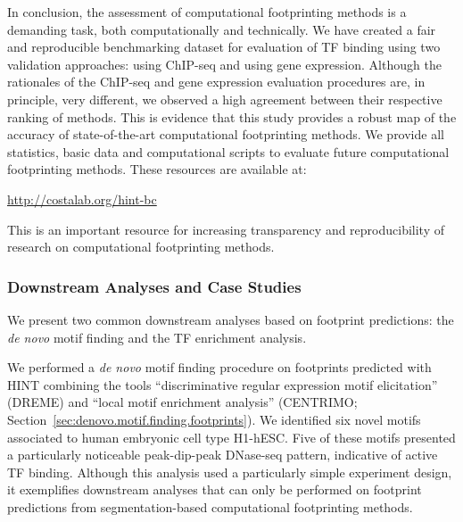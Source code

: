 In conclusion, the assessment of computational footprinting methods is a demanding task, both computationally and technically. We have created a fair and reproducible benchmarking dataset for evaluation of TF binding using two validation approaches: using ChIP-seq and using gene expression. Although the rationales of the ChIP-seq and gene expression evaluation procedures are, in principle, very different, we observed a high agreement between their respective ranking of methods. This is evidence that this study provides a robust map of the accuracy of state-of-the-art computational footprinting methods. We provide all statistics, basic data and computational scripts to evaluate future computational footprinting methods. These resources are available at:

\begin{center}
\url{http://costalab.org/hint-bc}
\end{center}

This is an important resource for increasing transparency and reproducibility of research on computational footprinting methods.

\subsubsection{Downstream Analyses and Case Studies}

We present two common downstream analyses based on footprint predictions: the \emph{de novo} motif finding and the TF enrichment analysis.

We performed a \emph{de novo} motif finding procedure on footprints predicted with HINT combining the tools ``discriminative regular expression motif elicitation'' (DREME) and ``local motif enrichment analysis'' (CENTRIMO; Section~\ref{sec:denovo.motif.finding.footprints}). We identified six novel motifs associated to human embryonic cell type H1-hESC. Five of these motifs presented a particularly noticeable peak-dip-peak DNase-seq pattern, indicative of active TF binding. Although this analysis used a particularly simple experiment design, it exemplifies downstream analyses that can only be performed on footprint predictions from segmentation-based computational footprinting methods.

